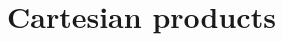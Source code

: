 \documentclass[../../main.tex]{subfiles}
\begin{document}
\ifmainfile
\else
    \makeatletter
    \begin{flushright}
        \@title \\
        \@author \\
        \@date
    \end{flushright}
    \addtocounter{chapter}{3}
    \addtocounter{section}{4}
    \section{Cartesian products}
\fi
\end{document}
